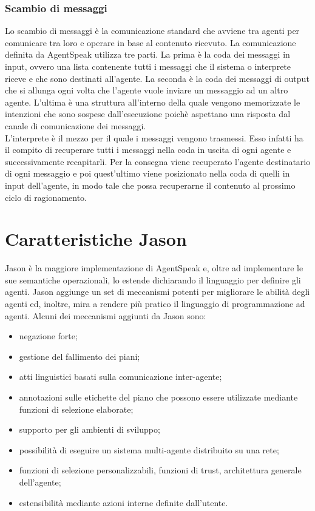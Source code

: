 \subsubsection{Scambio di messaggi}
Lo scambio di messaggi è la comunicazione standard che avviene tra agenti per comunicare tra loro e operare in base al contenuto ricevuto.
La comunicazione definita da AgentSpeak utilizza tre parti. La prima è la coda dei messaggi in input, ovvero una lista contenente tutti i messaggi che il sistema o interprete riceve e che sono destinati all'agente. La seconda è la coda dei messaggi di output che si allunga ogni volta che l'agente vuole inviare un messaggio ad un altro agente. L'ultima è una struttura all'interno della quale vengono memorizzate le intenzioni che sono sospese dall'esecuzione poichè aspettano una risposta dal canale di comunicazione dei messaggi.
\\
L'interprete è il mezzo per il quale i messaggi vengono trasmessi. Esso infatti ha il compito di recuperare tutti i messaggi nella coda in uscita di ogni agente e successivamente recapitarli. Per la consegna viene recuperato l'agente destinatario di ogni messaggio e poi quest'ultimo viene posizionato nella coda di quelli in input dell'agente, in modo tale che possa recuperarne il contenuto al prossimo ciclo di ragionamento.

\section{Caratteristiche Jason}
Jason è la maggiore implementazione di AgentSpeak e, oltre ad implementare le sue semantiche operazionali, lo estende dichiarando il linguaggio per definire gli agenti. Jason aggiunge un set di meccanismi potenti per migliorare le abilità degli agenti ed, inoltre, mira a rendere più pratico il linguaggio di programmazione ad agenti. Alcuni dei meccanismi aggiunti da Jason sono:
\begin{itemize}
\item negazione forte;
\item gestione del fallimento dei piani;
\item atti linguistici basati sulla comunicazione inter-agente;
\item annotazioni sulle etichette del piano che possono essere utilizzate mediante funzioni di selezione elaborate;
\item supporto per gli ambienti di sviluppo;
\item possibilità di eseguire un sistema multi-agente distribuito su una rete;
\item funzioni di selezione personalizzabili, funzioni di trust, architettura generale dell'agente;
\item estensibilità mediante azioni interne definite dall'utente.
\end{itemize}

